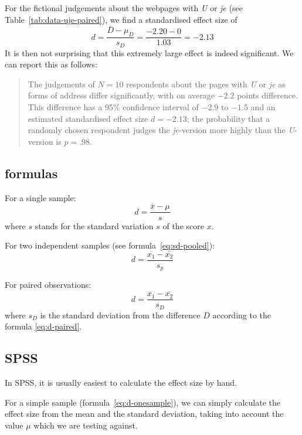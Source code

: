 \documentclass[
]{book}
\begin{document}
For the fictional judgements about the webpages with \emph{U} or \emph{je} (see
Table~\ref{tab:data-uje-paired}), we find a standardised
effect size of
\[d = \frac{ \overline{D}-\mu_D} {s_D} = \frac{ -2.20-0 } {1.03} = -2.13\]
It is then not surprising that this extremely large effect is indeed
significant. We can report this as follows:

\begin{quote}
The judgements of \(N=10\) respondents about the pages with \emph{U} or \emph{je}
as forms of address differ significantly, with on average \(-2.2\) points
difference. This difference has a 95\% confidence interval of
\(-2.9\) to \(-1.5\) and an estimated standardised effect size
\(d=-2.13\); the probability that a randomly chosen respondent
judges the \emph{je}-version more highly than the \emph{U}-version is \(p=.98\).
\end{quote}

\hypertarget{sec:formulas13-5}{%
\subsection{formulas}\label{sec:formulas13-5}}

For a single sample:
\begin{equation}
   \label{eq:d-onesample}
  d = \frac{\overline{x}-\mu}{s}
\end{equation}
where \(s\) stands for the standard variation \(s\)
of the score \(x\).

For two independent samples (see
formula~\eqref{eq:sd-pooled}):
\begin{equation}
  \label{eq:d-homoskedastic}
  d = \frac{ \overline{x_1}-\overline{x_2} } { s_p }
\end{equation}

For paired observations:
\begin{equation}
  \label{eq:d-paired}
  d = \frac{ \overline{x_1}-\overline{x_2} } { s_D }
\end{equation}
where \(s_D\) is the
standard deviation from the difference \(D\) according
to the formula \eqref{eq:d-paired}.

\hypertarget{spss-13-2}{%
\subsection{SPSS}\label{spss-13-2}}

In SPSS, it is usually easiest to calculate the effect size
by hand.

For a simple sample
(formula~\eqref{eq:d-onesample}), we can simply calculate the
effect size from the mean and the standard deviation, taking into account
the value \(\mu\) which we are testing against.
\end{document}

